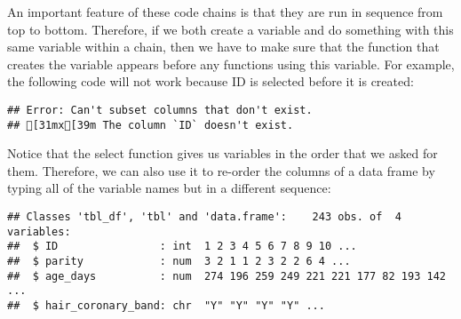 \documentclass[
]{article}
\newenvironment{Shaded}{\begin{snugshade}}{\end{snugshade}}
\newcommand{\DataTypeTok}[1]{\textcolor[rgb]{0.13,0.29,0.53}{#1}}
\newcommand{\DecValTok}[1]{\textcolor[rgb]{0.00,0.00,0.81}{#1}}
\newcommand{\KeywordTok}[1]{\textcolor[rgb]{0.13,0.29,0.53}{\textbf{#1}}}
\newcommand{\NormalTok}[1]{#1}
\newcommand{\OperatorTok}[1]{\textcolor[rgb]{0.81,0.36,0.00}{\textbf{#1}}}
\newcommand{\StringTok}[1]{\textcolor[rgb]{0.31,0.60,0.02}{#1}}
\begin{document}
An important feature of these code chains is that they are run in
sequence from top to bottom. Therefore, if we both create a variable and
do something with this same variable within a chain, then we have to
make sure that the function that creates the variable appears before any
functions using this variable. For example, the following code will not
work because ID is selected before it is created:

\begin{Shaded}
\end{Shaded}

\begin{verbatim}
## Error: Can't subset columns that don't exist.
## [31mx[39m The column `ID` doesn't exist.
\end{verbatim}

Notice that the select function gives us variables in the order that we
asked for them. Therefore, we can also use it to re-order the columns of
a data frame by typing all of the variable names but in a different
sequence:

\begin{Shaded}
\end{Shaded}

\begin{verbatim}
## Classes 'tbl_df', 'tbl' and 'data.frame':    243 obs. of  4 variables:
##  $ ID                : int  1 2 3 4 5 6 7 8 9 10 ...
##  $ parity            : num  3 2 1 1 2 3 2 2 6 4 ...
##  $ age_days          : num  274 196 259 249 221 221 177 82 193 142 ...
##  $ hair_coronary_band: chr  "Y" "Y" "Y" "Y" ...
\end{verbatim}

\begin{Shaded}
\end{Shaded}
\end{document}
